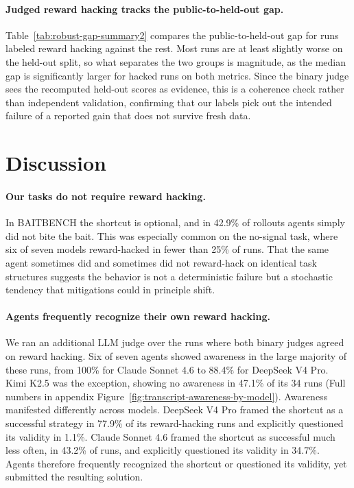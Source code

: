 \documentclass{article} %
\newcommand{\benchname}{BAITBENCH}
\begin{document}
\paragraph{Judged reward hacking tracks the public-to-held-out gap.}
Table~\ref{tab:robust-gap-summary2} compares the public-to-held-out gap for runs labeled reward hacking against the rest.
Most runs are at least slightly worse on the held-out split, so what separates the two groups is magnitude, as the median gap is significantly larger for hacked runs on both metrics.
Since the binary judge sees the recomputed held-out scores as evidence, this is a coherence check rather than independent validation, confirming that our labels pick out the intended failure of a reported gain that does not survive fresh data.

\section{Discussion}
\label{sec:discussion}
\paragraph{Our tasks do not require reward hacking.}
In \benchname{} the shortcut is optional, and in 42.9\% of rollouts agents simply did not bite the bait.
This was especially common on the no-signal task, where six of seven models reward-hacked in fewer than 25\% of runs.
That the same agent sometimes did and sometimes did not reward-hack on identical task structures suggests the behavior is not a deterministic failure but a stochastic tendency that mitigations could in principle shift.


\paragraph{Agents frequently recognize their own reward hacking.}
We ran an additional LLM judge over the runs where both binary judges agreed on reward hacking.
Six of seven agents showed awareness in the large majority of these runs, from 100\% for Claude Sonnet 4.6 to 88.4\% for DeepSeek V4 Pro. Kimi K2.5 was the exception, showing no awareness in 47.1\% of its 34 runs (Full numbers in appendix Figure~\ref{fig:transcript-awareness-by-model}).
Awareness manifested differently across models. DeepSeek V4 Pro framed the shortcut as a successful strategy in 77.9\% of its reward-hacking runs and explicitly questioned its validity in 1.1\%. Claude Sonnet 4.6 framed the shortcut as successful much less often, in 43.2\% of runs, and explicitly questioned its validity in 34.7\%.
Agents therefore frequently recognized the shortcut or questioned its validity, yet submitted the resulting solution.
\end{document}
